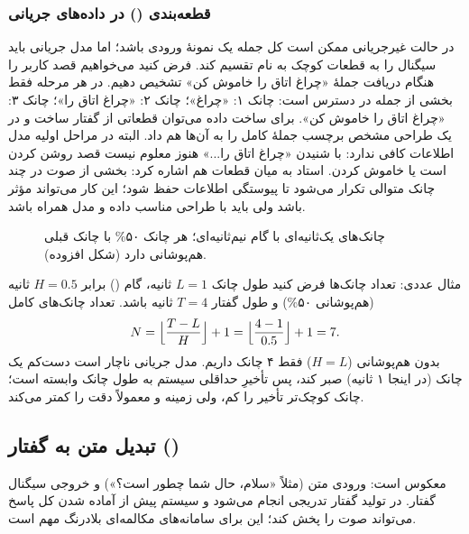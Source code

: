 \subsubsection{قطعه‌بندی () در داده‌های جریانی}
در حالت غیرجریانی ممکن است کل جمله یک نمونهٔ ورودی باشد؛ اما مدل جریانی باید سیگنال را به قطعات کوچک به نام  تقسیم کند. فرض کنید می‌خواهیم قصد کاربر را هنگام دریافت جملهٔ «چراغ اتاق را خاموش کن» تشخیص دهیم. در هر مرحله فقط بخشی از جمله در دسترس است: چانک ۱: «چراغ»؛ چانک ۲: «چراغ اتاق را»؛ چانک ۳: «چراغ اتاق را خاموش کن». برای ساخت داده می‌توان قطعاتی از گفتار ساخت و در یک طراحی مشخص برچسب  جملهٔ کامل را به آن‌ها هم داد. البته در مراحل اولیه مدل اطلاعات کافی ندارد: با شنیدن «چراغ اتاق را...» هنوز معلوم نیست قصد روشن کردن است یا خاموش کردن. استاد به  میان قطعات هم اشاره کرد: بخشی از صوت در چند چانک متوالی تکرار می‌شود تا پیوستگی اطلاعات حفظ شود؛ این کار می‌تواند مؤثر باشد ولی باید با طراحی مناسب داده و مدل همراه باشد.

\begin{figure}[htbp]
\centering
{}
\caption{چانک‌های یک‌ثانیه‌ای با گام نیم‌ثانیه‌ای؛ هر چانک ۵۰\% با چانک قبلی هم‌پوشانی دارد (شکل افزوده).}
\end{figure}

\begin{addedbox}{مثال عددی: تعداد چانک‌ها}
فرض کنید طول چانک $L=1$ ثانیه، گام () برابر $H=0.5$ ثانیه (هم‌پوشانی ۵۰\%) و طول گفتار $T=4$ ثانیه باشد. تعداد چانک‌های کامل
\[
N=\Bigl\lfloor\frac{T-L}{H}\Bigr\rfloor+1=\Bigl\lfloor\frac{4-1}{0.5}\Bigr\rfloor+1=7.
\]
بدون هم‌پوشانی ($H=L$) فقط ۴ چانک داریم. مدل جریانی ناچار است دست‌کم یک چانک (در اینجا ۱ ثانیه) صبر کند، پس تأخیرِ حداقلی سیستم به طول چانک وابسته است؛ چانک کوچک‌تر تأخیر را کم، ولی زمینه و معمولاً دقت را کمتر می‌کند.
\end{addedbox}

\subsection{تبدیل متن به گفتار ()}
 معکوس  است: ورودی متن (مثلاً «سلام، حال شما چطور است؟») و خروجی سیگنال گفتار. در  تولید گفتار تدریجی انجام می‌شود و سیستم پیش از آماده شدن کل پاسخ می‌تواند صوت را پخش کند؛ این برای سامانه‌های مکالمه‌ای بلادرنگ مهم است.

